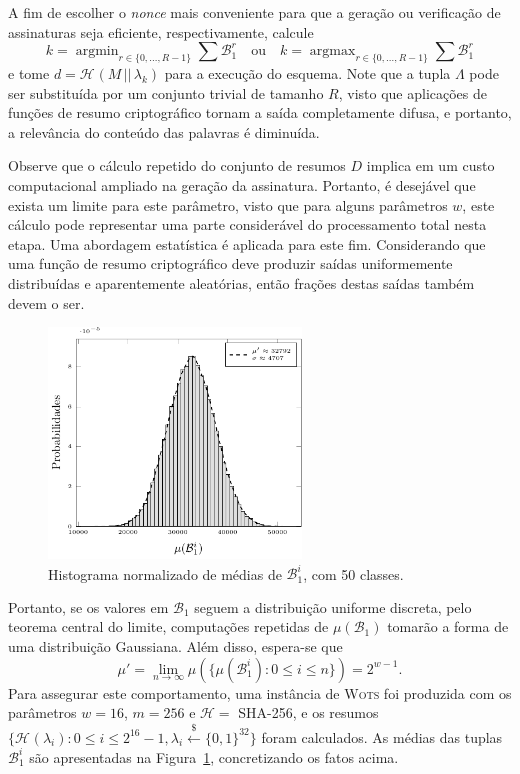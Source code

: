 \documentclass[12pt,notitlepage]{report}
\newcommand{\hh}{\mathcal{H}}
\newcommand{\hash}[2][]{\mathcal{H}^{#1}(#2)}
\newcommand{\concat}{\, \vert \vert \,}
\newcommand{\binwds}[1]{\{0, 1\}^{#1}}
\newcommand{\wots}{\textsc{Wots}}
\DeclareMathOperator*{\argmin}{argmin}
\DeclareMathOperator*{\argmax}{argmax}
\begin{document}
A fim de escolher o \emph{nonce} mais conveniente para que a geração ou verificação de assinaturas seja eficiente, respectivamente, calcule
\begin{equation}
    k = \argmin_{r \in \{0, \dots, R - 1\}} \sum \mathcal{B}_{1}^{r} \quad \text{ou} \quad
    k = \argmax_{r \in \{0, \dots, R - 1\}} \sum \mathcal{B}_{1}^{r}
\end{equation}
e tome $d = \hash{M \concat \lambda_k}$ para a execução do esquema. Note que a tupla $\Lambda$ pode ser substituída por um conjunto trivial de tamanho $R$, visto que aplicações de funções de resumo criptográfico tornam a saída completamente difusa, e portanto, a relevância do conteúdo das palavras é diminuída.

Observe que o cálculo repetido do conjunto de resumos $D$ implica em um custo computacional ampliado na geração da assinatura. Portanto, é desejável que exista um limite para este parâmetro, visto que para alguns parâmetros $w$, este cálculo pode representar uma parte considerável do processamento total nesta etapa. Uma abordagem estatística é aplicada para este fim. Considerando que uma função de resumo criptográfico deve produzir saídas uniformemente distribuídas e aparentemente aleatórias, então frações destas saídas também devem o ser.

\begin{figure}[ht]
    \centering
    \includegraphics[width=0.6\textwidth]{support/hist}
    \caption{Histograma normalizado de médias de $\mathcal{B}_{1}^{i}$, com 50 classes.}
    \label{fig:12}
\end{figure}

Portanto, se os valores em $\mathcal{B}_{1}$ seguem a distribuição uniforme discreta, pelo teorema central do limite, computações repetidas de $\mu(\mathcal{B}_{1})$ tomarão a forma de uma distribuição Gaussiana. Além disso, espera-se que
\begin{equation}
    \mu' = \lim_{n \to \infty} \mu(\{\mu(\mathcal{B}_{1}^{i}) : 0 \leq i \leq n\}) = 2^{w - 1}.
\end{equation}
Para assegurar este comportamento, uma instância de \wots{} foi produzida com os parâmetros $w = 16$, $m = 256$ e $\hh{} =$ SHA-256, e os resumos $\{\hash{\lambda_i} : 0 \leq i \leq 2^{16} - 1, \lambda_i \stackrel{\$}{\longleftarrow} \binwds{32}\}$ foram calculados. As médias das tuplas $\mathcal{B}_{1}^{i}$ são apresentadas na Figura~\ref{fig:12}, concretizando os fatos acima.
\end{document}
